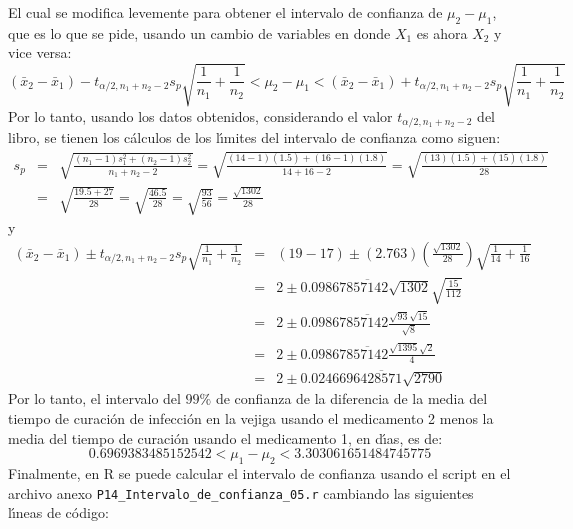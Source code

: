 \begin{solucion}
 El cual se modifica levemente para obtener el intervalo de confianza de $\mu_2 - \mu_1$, que es lo que se pide, usando un cambio de variables en donde $X_1$ es ahora $X_2$ y vice versa:
 \begin{equation*}
  \left( \bar{x}_2 - \bar{x}_1  \right) - t_{\alpha/2,n_1+n_2-2}s_p \sqrt{\frac{1}{n_1} + \frac{1}{n_2}} < \mu_2 - \mu_1 < \left( \bar{x}_2 - \bar{x}_1  \right) + t_{\alpha/2,n_1+n_2-2}s_p \sqrt{\frac{1}{n_1} + \frac{1}{n_2}}
 \end{equation*}
 Por lo tanto, usando los datos obtenidos, considerando el valor $t_{\alpha/2,n_1+n_2-2}$ del libro, se tienen los c\'alculos de los l\'{\i}mites del intervalo de confianza como siguen:
 \begin{eqnarray*}
  s_p & = & \sqrt{\frac{\left( n_1-1 \right)s_1^2 + \left( n_2 - 1 \right)s_2^2}{n_1 + n_2 - 2}} = \sqrt{\frac{(14-1)(1.5)+(16-1)(1.8)}{14+16-2}} = \sqrt{\frac{(13)(1.5)+(15)(1.8)}{28}} \\
  & = & \sqrt{\frac{19.5 + 27}{28}} = \sqrt{\frac{46.5}{28}} = \sqrt{\frac{93}{56}} = \frac{\sqrt{1302}}{28}
 \end{eqnarray*}
 y
 \begin{eqnarray*}
  \left( \bar{x}_2 - \bar{x}_1  \right) \pm t_{\alpha/2,n_1+n_2-2}s_p \sqrt{\frac{1}{n_1} + \frac{1}{n_2}}
  & = & (19-17) \pm (2.763) \left( \frac{\sqrt{1302}}{28} \right) \sqrt{\frac{1}{14} + \frac{1}{16}} \\
  & = & 2 \pm 0.09867\overline{857142}\sqrt{1302}\sqrt{\frac{15}{112}} \\
  & = & 2 \pm 0.09867\overline{857142} \frac{\sqrt{93}\sqrt{15}}{\sqrt{8}} \\
  & = & 2 \pm 0.09867\overline{857142}\frac{\sqrt{1395}\sqrt{2}}{4} \\
  & = & 2 \pm 0.0246696\overline{428571} \sqrt{2790}
 \end{eqnarray*}
 Por lo tanto, el intervalo del $99\%$ de confianza de la diferencia de la media del tiempo de curaci\'on de infecci\'on en la vejiga usando el medicamento 2 menos la media del tiempo de curaci\'on usando el medicamento 1, en d\'{\i}as, es de:
 \begin{equation*}
  0.6969383485152542 < \mu_1 - \mu_2 < 3.303061651484745775
 \end{equation*}
 Finalmente, en R se puede calcular el intervalo de confianza usando el script en el archivo anexo \texttt{P14\_Intervalo\_de\_confianza\_05.r} cambiando las siguientes l\'{\i}neas de c\'odigo:
 \begin{verbatim}

\end{verbatim}
\end{solucion}
